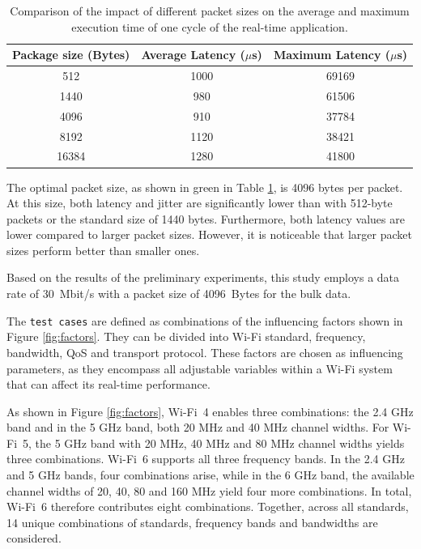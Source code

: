 \begin{table}
\begin{tabular}{||c|c|c||}
\hline\hline
\textbf{Package size (Bytes)} & \textbf{Average Latency ($\mu$s)} & \textbf{Maximum Latency ($\mu$s)} \\
\hline\hline
512    & 1000 & 69169 \\
\hline
1440   &  980 & 61506 \\
\hline
\rowcolor{green!30}
4096   &  910 & 37784 \\
\hline
8192   & 1120 & 38421 \\
\hline
16384  & 1280 & 41800 \\
\hline\hline
\end{tabular}
\caption{Comparison of the impact of different packet sizes on the average and maximum execution time of one cycle of the real-time application.}
\label{tab:packetsize}
\end{table}

The optimal packet size, as shown in green in Table \ref{tab:packetsize}, is 4096 bytes per packet.  
At this size, both latency and jitter are significantly lower than with 512-byte packets or the standard size of 1440 bytes.  
Furthermore, both latency values are lower compared to larger packet sizes.  
However, it is noticeable that larger packet sizes perform better than smaller ones.  

Based on the results of the preliminary experiments, this study employs a data rate of 30~Mbit/s with a packet size of 4096~Bytes for the bulk data.  

The \texttt{test cases} are defined as combinations of the influencing factors shown in Figure \ref{fig:factors}.
They can be divided into Wi-Fi standard, frequency, bandwidth, \ac{QoS} and transport protocol.  
These factors are chosen as influencing parameters, as they encompass all adjustable variables within a Wi-Fi system that can affect its real-time performance.

As shown in Figure \ref{fig:factors}, Wi-Fi~4 enables three combinations: the 2.4 GHz band and in the 5 GHz band, both 20 MHz and 40 MHz channel widths.  
For Wi-Fi~5, the 5 GHz band with 20 MHz, 40 MHz and 80 MHz channel widths yields three combinations.  
Wi-Fi~6 supports all three frequency bands.  
In the 2.4 GHz and 5 GHz bands, four combinations arise, while in the 6 GHz band, the available channel widths of 20, 40, 80 and 160 MHz yield four more combinations.  
In total, Wi-Fi~6 therefore contributes eight combinations.  
Together, across all standards, 14 unique combinations of standards, frequency bands and bandwidths are considered.  

